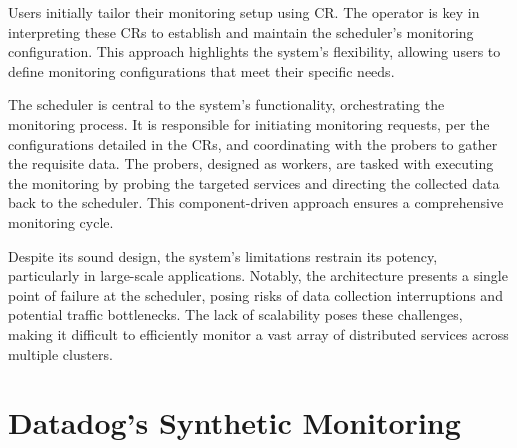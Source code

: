 Users initially tailor their monitoring setup using \ac{CR}. The operator is key in interpreting these \ac{CR}s to establish and maintain the scheduler's monitoring configuration. This approach highlights the system's flexibility, allowing users to define monitoring configurations that meet their specific needs. 

The scheduler is central to the system's functionality, orchestrating the monitoring process. It is responsible for initiating monitoring requests, per the configurations detailed in the \ac{CR}s, and coordinating with the probers to gather the requisite data. The probers, designed as workers, are tasked with executing the monitoring by probing the targeted services and directing the collected data back to the scheduler. This component-driven approach ensures a comprehensive monitoring cycle. 

Despite its sound design, the system's limitations restrain its potency, particularly in large-scale applications. Notably, the architecture presents a single point of failure at the scheduler, posing risks of data collection interruptions and potential traffic bottlenecks. The lack of scalability poses these challenges, making it difficult to efficiently monitor a vast array of distributed services across multiple clusters. 

\section{Datadog's Synthetic Monitoring}

